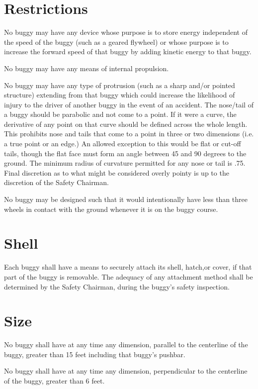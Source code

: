 \documentclass[openany]{book}
\begin{document}
\section{Restrictions}

No buggy may have any device whose purpose is to store energy independent of the speed of the buggy (such as a geared flywheel) or whose purpose is to increase the forward speed of that buggy by adding kinetic energy to that buggy.

No buggy may have any means of internal propulsion.

No buggy may have any type of protrusion (such as a sharp and/or pointed structure) extending from that buggy which could increase the likelihood of injury to the driver of another buggy in the event of an accident. The nose/tail of a buggy should be parabolic and not come to a point. If it were a curve, the derivative of any point on that curve should be defined across the whole length. This prohibits nose and tails that come to a point in three or two dimensions (i.e. a true point or an edge.) An allowed exception to this would be flat or cut-off tails, though the flat face must form an angle between 45 and 90 degrees to the ground. The minimum radius of curvature permitted for any nose or tail is .75. Final discretion as to what might be considered overly pointy is up to the discretion of the Safety Chairman.

No buggy may be designed such that it would intentionally have less than three wheels in contact with the ground whenever it is on the buggy course.

\section{Shell}

Each buggy shall have a means to securely attach its shell, hatch,or cover, if that part of the buggy is removable. The adequacy of any attachment method shall be determined by the Safety Chairman, during the buggy's safety inspection.

\section{Size}

No buggy shall have at any time any dimension, parallel to the centerline of the buggy, greater than 15 feet including that buggy's pushbar.

No buggy shall have at any time any dimension, perpendicular to the centerline of the buggy, greater than 6 feet.
\end{document}
